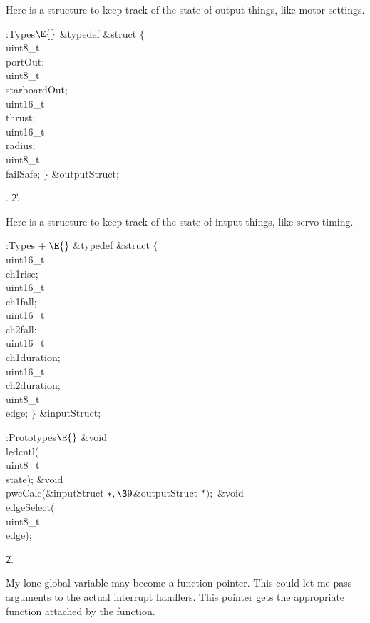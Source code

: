 Here is a structure to keep track of the state of output things,
like motor settings.

\Y\B\4:Types\X${}\E{}$\6
\&{typedef} \&{struct} ${}\{{}$\1\6
\\{uint8\_t}\\{portOut};\6
\\{uint8\_t}\\{starboardOut};\6
\\{uint16\_t}\\{thrust};\6
\\{uint16\_t}\\{radius};\6
\\{uint8\_t}\\{failSafe};\2\6
${}\}{}$ \&{outputStruct};\par
{}.
\U2.\fi

Here is a structure to keep track of the state of intput things,
like servo timing.

\Y\B\4:Types\X${}\mathrel+\E{}$\6
\&{typedef} \&{struct} ${}\{{}$\1\6
\\{uint16\_t}\\{ch1rise};\6
\\{uint16\_t}\\{ch1fall};\6
\\{uint16\_t}\\{ch2fall};\6
\\{uint16\_t}\\{ch1duration};\6
\\{uint16\_t}\\{ch2duration};\6
\\{uint8\_t}\\{edge};\2\6
${}\}{}$ \&{inputStruct};\par
\fi

\B{}:Prototypes\X${}\E{}$\6
\&{void} \\{ledcntl}(\\{uint8\_t}\\{state});\6
\&{void} \\{pwcCalc}(\&{inputStruct} ${}{*},\39{}$\&{outputStruct} ${}{*});{}$\6
\&{void} \\{edgeSelect}(\\{uint8\_t}\\{edge});\par
\U2.\fi

My lone global variable may become a function pointer.
This could let me pass arguments to the actual interrupt handlers.
This pointer gets the appropriate function attached by the 
function.


